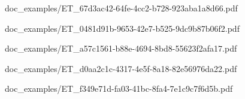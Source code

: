 \documentclass{report}
\begin{document}
        
                    {doc_examples/ET_67d3ac42-64fe-4cc2-b728-923aba1a8d66.pdf}
 
        
                    {doc_examples/ET_0481d91b-9653-42e7-b525-9dc9b87b06f2.pdf}

        
                    {doc_examples/ET_a57c1561-b88e-4694-8bd8-55623f2afa17.pdf}
        
        
                    {doc_examples/ET_d0aa2c1c-4317-4e5f-8a18-82e56976da22.pdf}
        
        
                    {doc_examples/ET_f349e71d-fa03-41bc-8fa4-7e1c9c7f6d5b.pdf}
\end{document}
